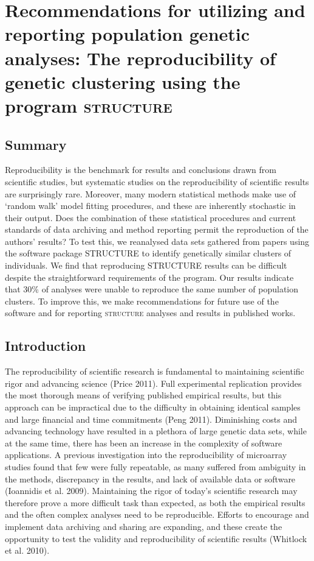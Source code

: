 \chapter{Recommendations for utilizing and reporting population genetic analyses: The reproducibility of genetic clustering using the program \textsc{structure}}
\label{chap:reproducibility}

\section{Summary}

Reproducibility is the benchmark for results and conclusions drawn from scientific studies, but systematic studies on the reproducibility of scientific results are surprisingly rare. Moreover, many modern statistical methods make use of ‘random walk’ model fitting procedures, and these are inherently stochastic in their output. Does the combination of these statistical procedures and current standards of data archiving and method reporting permit the reproduction of the authors’ results? To test this, we reanalysed data sets gathered from papers using the software package STRUCTURE to identify genetically similar clusters of individuals. We find that reproducing STRUCTURE results can be difficult despite the straightforward requirements of the program. Our results indicate that 30\% of analyses were unable to reproduce the same number of population clusters. To improve this, we make recommendations for future use of the software and for reporting \textsc{structure} analyses and results in published works.

\section{Introduction}
The reproducibility of scientific research is fundamental to maintaining scientific rigor and advancing science (Price 2011). Full experimental replication provides the most thorough means of verifying published empirical results, but this approach can be impractical due to the difficulty in obtaining identical samples and large financial and time commitments (Peng 2011). Diminishing costs and advancing technology have resulted in a plethora of large genetic data sets, while at the same time, there has been an increase in the complexity of software applications. A previous investigation into the reproducibility of microarray studies found that few were fully repeatable, as many suffered from ambiguity in the methods, discrepancy in the results, and lack of available data or software (Ioannidis et al. 2009). Maintaining the rigor of today’s scientific research may therefore prove a more difficult task than expected, as both the empirical results and the often complex analyses need to be reproducible. Efforts to encourage and implement data archiving and sharing are expanding, and these create the opportunity to test the validity and reproducibility of scientific results (Whitlock et al. 2010).

